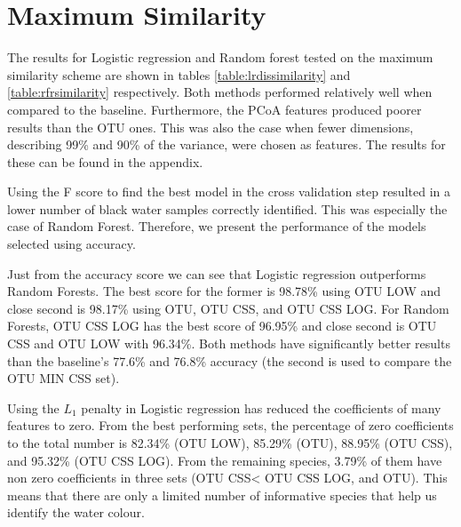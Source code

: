 \section{Maximum Similarity}
The results for Logistic regression and Random forest tested on the maximum similarity scheme are shown in tables \ref{table:lrdissimilarity} and \ref{table:rfrsimilarity} respectively. Both methods performed relatively well when compared to the baseline. Furthermore, the PCoA features produced poorer results than the OTU ones. This was also the case when fewer dimensions, describing 99\% and 90\% of the variance, were chosen as features. The results for these can be found in the appendix.

Using the F score to find the best model in the cross validation step resulted in a lower number of black water samples correctly identified. This was especially the case of Random Forest. Therefore, we present the performance of the models selected using accuracy.

Just from the accuracy score we can see that Logistic regression outperforms Random Forests. The best score for the former is 98.78\% using OTU LOW and close second is 98.17\% using OTU, OTU CSS, and OTU CSS LOG. For Random Forests, OTU CSS LOG has the best score of 96.95\% and close second is OTU CSS and OTU LOW with 96.34\%. Both methods have significantly better results than the baseline's 77.6\% and 76.8\% accuracy (the second is used to compare the OTU MIN CSS set).

Using the $L_1$ penalty in Logistic regression has reduced the coefficients of many features to zero. From the best performing sets, the percentage of zero coefficients to the total number is 82.34\% (OTU LOW), 85.29\% (OTU), 88.95\% (OTU CSS), and 95.32\% (OTU CSS LOG). From the remaining species, 3.79\% of them have non zero coefficients in three sets (OTU CSS< OTU CSS LOG, and OTU). This means that there are only a limited number of informative species that help us identify the water colour. 


